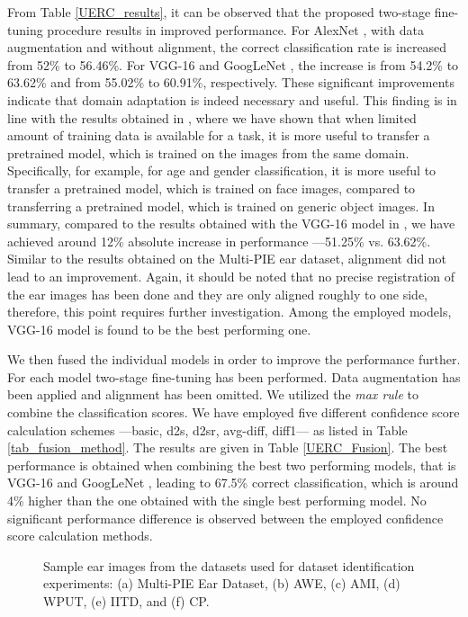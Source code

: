 \documentclass[11pt,journal,compsoc]{IEEEtran}
\begin{document}
From Table \ref{UERC_results}, it can be observed that the proposed two-stage fine-tuning procedure results in improved performance. For AlexNet \cite{Krizhevsky_2012}, with data augmentation and without alignment, the correct classification rate is increased from 52\% to 56.46\%. For VGG-16 \cite{Simonyan_2014} and GoogLeNet \cite{Szegedy_2015}, the increase is from 54.2\% to 63.62\% and from 55.02\% to 60.91\%, respectively. These significant improvements indicate that domain adaptation is indeed necessary and useful.  
This finding is in line with the results obtained in \cite{Ozbulak_2016}, where we have shown that when limited amount of training data is available for a task, it is more useful to transfer a pretrained model, which is trained on the images from the same domain. Specifically, for example, for age and gender classification, it is more useful to transfer a pretrained model, which is trained on face images, compared to transferring a pretrained model, which is trained on generic object images. In summary, compared to the results obtained with the VGG-16 \cite{Simonyan_2014} model in \cite{Emersic_2017_c}, we have achieved around 12\% absolute increase in performance ---51.25\% vs. 63.62\%. Similar to the results obtained on the Multi-PIE ear dataset, alignment did not lead to an improvement. Again, it should be noted that no precise registration of the ear images has been done and they are only aligned roughly to one side, therefore, this point requires further investigation. Among the employed models, VGG-16 model is found to be the best performing one.

We then fused the individual models in order to improve the performance further. For each model two-stage fine-tuning has been performed. Data augmentation has been applied and alignment has been omitted. We utilized the \textit{max rule} \cite{Kittler_1998} to combine the classification scores. We have employed five different confidence score calculation schemes ---basic, d2s, d2sr, avg-diff, diff1--- as listed in Table \ref{tab_fusion_method}. The results are given in Table \ref{UERC_Fusion}. The best performance is obtained when combining the best two performing models, that is VGG-16 \cite{Simonyan_2014} and GoogLeNet \cite{Szegedy_2015}, leading to 67.5\% correct classification, which is around 4\% higher than the one obtained with the single best performing model. No significant performance difference is observed between the employed confidence score calculation methods.

\begin{figure}[t]
	\caption{Sample ear images from the datasets used for dataset identification experiments: (a) Multi-PIE Ear Dataset, (b) AWE, (c) AMI, (d) WPUT, (e) IITD, and (f) CP.}
	\label{fig_all_dataset}
\end{figure}
\end{document}
